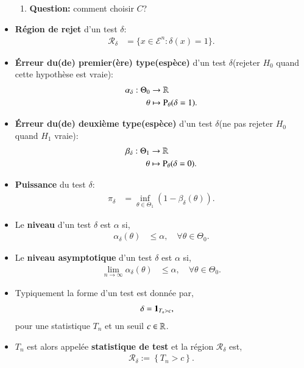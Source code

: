 \begin{frame}
\begin{itemize}
\begin{enumerate}[-]
               \item \textbf{Question:} comment choisir $C$?
         \end{enumerate}
         \framebreak
         \item \textbf{Région de rejet} d'un test $\delta$: \begin{align*}
             \mathcal{R}_{\delta} &=\{x\in \mathcal{E}^n: \delta(x) = 1\}.
         \end{align*}
         \item \textbf{Érreur du(de) premier(ère) type(espèce)} d'un test $\delta$(rejeter $H_0$ quand cette hypothèse est vraie):
         \begin{align*}
             \alpha_\delta : \Theta_0 &\rightarrow \mathbb{R}\\
             \theta &\mapsto \operatorname{P}_\theta(\delta = 1).
         \end{align*}
         \item \textbf{Érreur du(de) deuxième type(espèce)} d'un test $\delta$(ne pas rejeter $H_0$ quand $H_1$ vraie):
         \begin{align*}
            \beta_\delta : \Theta_1 &\rightarrow \mathbb{R}\\
            \theta &\mapsto \operatorname{P}_\theta(\delta = 0).
        \end{align*}
        \item \textbf{Puissance} du test $\delta$:
        \begin{align*}
            \pi_\delta &=\inf_{\theta\in\Theta_1}\left(1- \beta_\delta(\theta)\right).
        \end{align*}
        \framebreak 
        \item Le \textbf{niveau} d'un test $\delta$ est $\alpha$ si,\begin{align*}
            \alpha_\delta(\theta) &\leq \alpha,  \quad \forall \theta \in \Theta_0.
        \end{align*}
        \item Le \textbf{niveau asymptotique} d'un test $\delta$ est $\alpha$ si,\begin{align*}
            \lim_{n\to \infty}\alpha_\delta(\theta) &\leq \alpha,  \quad \forall \theta \in \Theta_0.
        \end{align*}
        \item Typiquement la forme d'un test est donnée par,
        \begin{align*}
            \delta &=\mathbf{1}_{T_n> c},
        \end{align*}
        pour une statistique $T_n$ et un seuil $c\in \mathbb{R}$.
        \item $T_n$ est alors appelée \textbf{statistique de test} et la région $\mathcal{R}_\delta$ est, 
        \begin{align*}
            \mathcal{R}_\delta := \left\{T_n > c\right\}.
        \end{align*}
    \end{itemize}
\end{frame}
